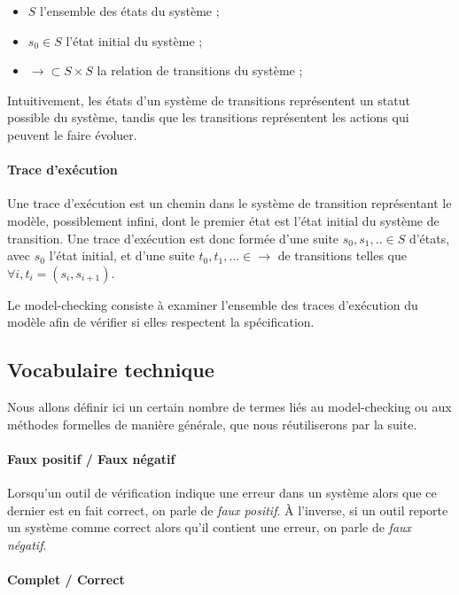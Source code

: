 \begin{itemize}
\item
  \(S\) l'ensemble des états du système ;
\item
  \(s_0 \in S\) l'état initial du système ;
\item
  \(\rightarrow \subset S \times S\) la relation de transitions du
  système ;
\end{itemize}

Intuitivement, les états d'un système de transitions représentent un
statut possible du système, tandis que les transitions représentent les
actions qui peuvent le faire évoluer.

\paragraph{Trace d'exécution}
Une trace d'exécution est un chemin dans le système de transition représentant
le modèle, possiblement infini, dont le premier état est l'état initial du
système de transition. Une trace d'exécution est donc formée d'une suite \(s_0,
s_1, .. \in S\) d'états, avec \(s_0\) l'état initial, et d'une suite \(t_0, t_1,
... \in \rightarrow\) de transitions telles que \(\forall i, t_i = (s_i,
s_{i+1})\).

Le model-checking consiste à examiner l'ensemble des traces
d'exécution du modèle afin de vérifier si elles respectent la spécification.

\subsection{Vocabulaire technique}

Nous allons définir ici un certain nombre de termes liés au model-checking ou
aux méthodes formelles de manière générale, que nous réutiliserons par la suite.

\paragraph{Faux positif / Faux négatif}

Lorsqu'un outil de vérification indique une erreur dans un système alors que ce
dernier est en fait correct, on parle de \emph{faux positif}. À l'inverse, si un
outil reporte un système comme correct alors qu'il contient une erreur, on parle
de \emph{faux négatif}.

\paragraph{Complet / Correct}

